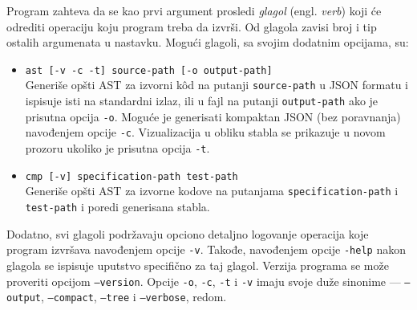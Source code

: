 Program zahteva da se kao prvi argument prosledi \emph{glagol} (engl. \emph{verb}) koji će odrediti operaciju koju program treba da izvrši. Od glagola zavisi broj i tip ostalih argumenata u nastavku. Mogući glagoli, sa svojim dodatnim opcijama, su:
\begin{itemize}
    \item \texttt{ast [-v -c -t] source-path [-o output-path]} \\
    Generiše opšti AST za izvorni k\^od na putanji \texttt{source-path} u JSON formatu i ispisuje isti na standardni izlaz, ili u fajl na putanji \texttt{output-path} ako je prisutna opcija \texttt{-o}. Moguće je generisati kompaktan JSON (bez poravnanja) navođenjem opcije \texttt{-c}. Vizualizacija u obliku stabla se prikazuje u novom prozoru ukoliko je prisutna opcija \texttt{-t}.
    \item \texttt{cmp [-v] specification-path test-path} \\
    Generiše opšti AST za izvorne kodove na putanjama \texttt{specification-path} i \texttt{test-path} i poredi generisana stabla. 
\end{itemize} 

Dodatno, svi glagoli podržavaju opciono detaljno logovanje operacija koje program izvršava navođenjem opcije \texttt{-v}. Takođe, navođenjem opcije \texttt{-help} nakon glagola se ispisuje uputstvo specifično za taj glagol. Verzija programa se može proveriti opcijom \texttt{--version}. Opcije \texttt{-o}, \texttt{-c}, \texttt{-t} i \texttt{-v} imaju svoje duže sinonime --- \texttt{--output}, \texttt{--compact}, \texttt{--tree} i \texttt{--verbose}, redom.


